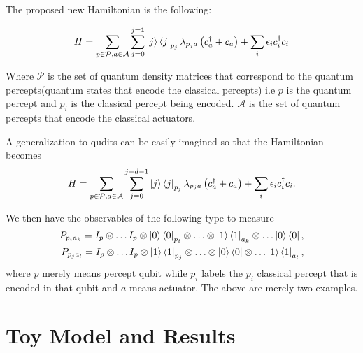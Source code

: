 \documentclass[twocolumn,prX,longbibliography]{revtex4}
\begin{document}
The proposed new Hamiltonian is the following:
 
 \begin{equation}
  H = \sum_{p \in\mathcal{P},a \in \mathcal{A} }\sum_{j=0}^{j=1}  \ket{j}\bra{j}_{p_j} \lambda_{p_ja} \left(c_a^{\dagger} + c_a\right)  + \sum_{i} \epsilon_i c_i^{\dagger}c_i
 \end{equation}
 
 Where \(\mathcal{P} \) is the set of quantum density matrices that correspond to the quantum percepts(quantum states that encode the classical percepts) i.e \( p\) is the quantum percept and \( p_i\) is the classical percept being encoded. \(\mathcal{A} \) is the set of quantum percepts that encode the classical actuators.

  A generalization to qudits can be easily imagined so that the Hamiltonian becomes 
 \begin{equation}
  H = \sum_{p \in\mathcal{P},a \in \mathcal{A} }\sum_{j=0}^{j=d-1}  \ket{j}\bra{j}_{p_j} \lambda_{p_ja} \left(c_a^{\dagger} + c_a\right)  + \sum_{i} \epsilon_i c_i^{\dagger}c_i.
 \end{equation}

We then have the observables of the following type to  measure 
 \begin{align}
  P_{p_ia_k} = I_p \otimes \hdots I_p \otimes \ket{0}\bra{0}_{p_i}\otimes \hdots \otimes \ket{1}\bra{1}_{a_k} \otimes \hdots \ket{0}\bra{0}, \\
    P_{p_ja_l} = I_p \otimes \hdots I_p \otimes \ket{1}\bra{1}_{p_j}\otimes \hdots \otimes \ket{0}\bra{0} \otimes \hdots \ket{1}\bra{1}_{a_l}, 
  \end{align}
  where \(p\) merely means percept qubit while \(p_i\) labels the \(p_i\) classical percept that is encoded in that qubit and \(a\) means actuator. The above are merely two examples. 
  \section{Toy Model and Results}
  
\end{document}
